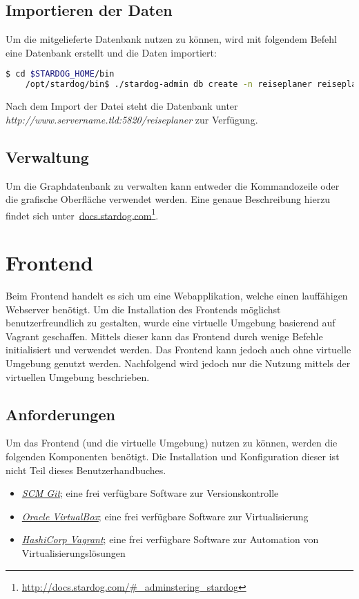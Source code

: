\subsection{Importieren der Daten}
\label{chap:anh:ihb:backend:import}
Um die mitgelieferte Datenbank nutzen zu können, wird mit folgendem Befehl eine Datenbank erstellt und die Daten importiert:
\begin{lstlisting}[language=bash]
                    $ cd $STARDOG_HOME/bin
    /opt/stardog/bin$ ./stardog-admin db create -n reiseplaner reiseplaner.owl
\end{lstlisting}
Nach dem Import der Datei steht die Datenbank unter \textit{http://www.servername.tld:5820/reiseplaner} zur Verfügung.

\subsection{Verwaltung}
\label{chap:anh:ihb:backend:mgmt}
Um die Graphdatenbank zu verwalten kann entweder die Kommandozeile oder die grafische Oberfläche verwendet werden. Eine genaue Beschreibung hierzu findet sich unter~\href{http://docs.stardog.com/\#_adminstering_stardog}{docs.stardog.com}\footnote{\url{http://docs.stardog.com/\#_adminstering_stardog}}.


\section{Frontend}
\label{chap:anh:ihb:frontend}
Beim Frontend handelt es sich um eine Webapplikation, welche einen lauffähigen Webserver benötigt. Um die Installation des Frontends möglichst benutzerfreundlich zu gestalten, wurde eine virtuelle Umgebung basierend auf Vagrant geschaffen. Mittels dieser kann das Frontend durch wenige Befehle initialisiert und verwendet werden. Das Frontend kann jedoch auch ohne virtuelle Umgebung genutzt werden. Nachfolgend wird jedoch nur die Nutzung mittels der virtuellen Umgebung beschrieben.

\subsection{Anforderungen}
\label{chap:anh:ihb:frontend:req}
Um das Frontend (und die virtuelle Umgebung) nutzen zu können, werden die folgenden Komponenten benötigt. Die Installation und Konfiguration dieser ist nicht Teil dieses Benutzerhandbuches.
\begin{itemize}
    \item \textit{\href{http://git-scm.com/}{SCM Git}}; eine frei verfügbare Software zur Versionskontrolle
    \item \textit{\href{https://www.virtualbox.org/wiki/Downloads}{Oracle VirtualBox}}; eine frei verfügbare Software zur Virtualisierung
    \item \textit{\href{https://www.vagrantup.com/downloads.html}{HashiCorp Vagrant}}; eine frei verfügbare Software zur Automation von Virtualisierungslösungen
\end{itemize}

